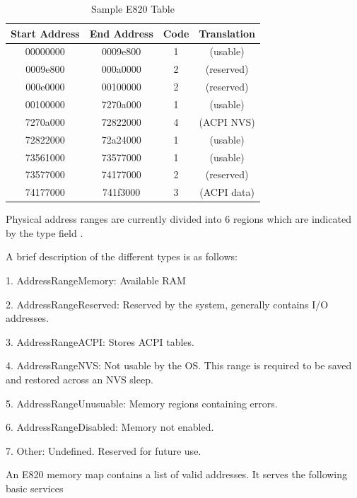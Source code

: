 \setlength{\belowcaptionskip}{-10pt}

\begin{table}[H]
  \centering
  \begin{tabular}{|c|c|c|c|}
      \hline
      Start Address & End Address & Code & Translation \\
      \hline 
      \hline
      00000000 & 0009e800 & 1 & (usable) \\
      \hline 
      0009e800 & 000a0000 & 2 & (reserved) \\
      \hline 
      000e0000 & 00100000 & 2 & (reserved) \\
      \hline 
      00100000 & 7270a000 & 1 & (usable) \\
      \hline 
      7270a000 & 72822000 & 4 & (ACPI NVS) \\
      \hline 
      72822000 & 72a24000 & 1 & (usable) \\
      \hline 
      73561000 & 73577000 & 1 & (usable) \\
      \hline 
      73577000 & 74177000 & 2 & (reserved) \\
      \hline
      74177000 & 741f3000 & 3 & (ACPI data)  \\
      \hline
  \end{tabular}
  \caption{Sample E820 Table}
  \label{tab:e820table}
\end{table}



Physical address ranges are currently divided into 6 regions which are indicated by the type field \cite{acpi_manual}.

A brief description of the different types is as follows:

1. AddressRangeMemory: Available RAM

2. AddressRangeReserved: Reserved by the system, generally contains I/O addresses.

3. AddressRangeACPI: Stores ACPI tables.

4. AddressRangeNVS: Not usable by the OS. This range is required to be saved and restored across an NVS sleep.

5. AddressRangeUnusuable: Memory regions containing errors.

6. AddressRangeDisabled: Memory not enabled.

7. Other: Undefined. Reserved for future use.

An E820 memory map contains a list of valid addresses. It serves the following basic services

